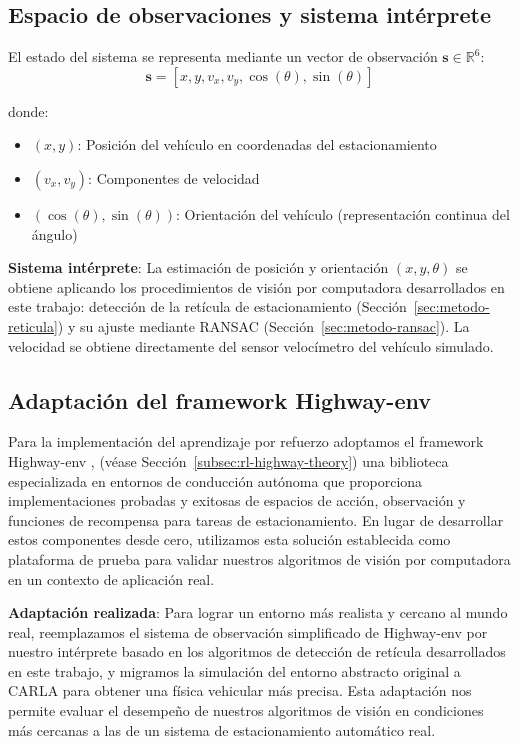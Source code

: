 \subsection{Espacio de observaciones y sistema intérprete}\label{subsec:rl-observations}

El estado del sistema se representa mediante un vector de observación $\mathbf{s} \in \mathbb{R}^6$:
\begin{equation}
    \mathbf{s} = [x, y, v_x, v_y, \cos(\theta), \sin(\theta)]
\end{equation}

donde:
\begin{itemize}
    \item $(x, y)$: Posición del vehículo en coordenadas del estacionamiento
    \item $(v_x, v_y)$: Componentes de velocidad
    \item $(\cos(\theta), \sin(\theta))$: Orientación del vehículo (representación continua del ángulo)
\end{itemize}


\textbf{Sistema intérprete}: La estimación de posición y orientación $(x, y, \theta)$ se obtiene
aplicando los procedimientos de visión por computadora desarrollados en este trabajo:
detección de la retícula de estacionamiento (Sección~\ref{sec:metodo-reticula}) y
su ajuste mediante RANSAC (Sección~\ref{sec:metodo-ransac}). La velocidad se obtiene
directamente del sensor velocímetro del vehículo simulado.

\subsection{Adaptación del framework Highway-env}\label{subsec:rl-highway-adaptation}

Para la implementación del aprendizaje por refuerzo adoptamos el framework Highway-env \cite{highway-env}, (véase Sección~\ref{subsec:rl-highway-theory}) una biblioteca especializada en entornos de conducción autónoma que proporciona implementaciones
probadas y exitosas de espacios de acción, observación y funciones de recompensa para tareas
de estacionamiento. En lugar de desarrollar estos componentes desde cero, utilizamos esta solución 
establecida como plataforma de prueba para validar nuestros algoritmos de visión por computadora 
en un contexto de aplicación real.


\textbf{Adaptación realizada}: Para lograr un entorno más realista y cercano al mundo real, 
reemplazamos el sistema de observación simplificado de Highway-env por nuestro intérprete basado en
los algoritmos de detección de retícula desarrollados en este trabajo, y migramos la
simulación del entorno abstracto original a CARLA para obtener una física vehicular
más precisa. Esta adaptación nos permite evaluar el desempeño de nuestros algoritmos de visión 
en condiciones más cercanas a las de un sistema de estacionamiento automático real.



